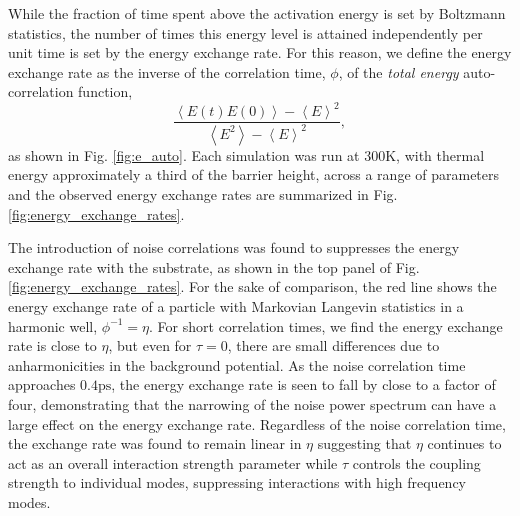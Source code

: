 \documentclass[7pt]{article}
\newcommand{\ps}{\si{\pico\second}}
\newcommand{\K}{\si{\kelvin}}
\begin{document}
While the fraction of time spent above the activation energy is set by Boltzmann statistics, the number of times this energy level is attained independently per unit time is set by the energy exchange rate. For this reason, we define the energy exchange rate as the inverse of the correlation time, $\phi$, of the \emph{total energy} auto-correlation function, $$\frac{\left<E(t)E(0)\right> - \left<E\right>^2}{\left<E^2\right> - \left<E\right>^2},$$ as shown in Fig. \ref{fig:e_auto}. Each simulation was run at $300\K$, with thermal energy approximately a third of the barrier height, across a range of parameters and the observed energy exchange rates are summarized in Fig. \ref{fig:energy_exchange_rates}. 
 
The introduction of noise correlations was found to suppresses the energy exchange rate with the substrate, as shown in the top panel of Fig. \ref{fig:energy_exchange_rates}. For the sake of comparison, the red line shows the energy exchange rate of a particle with Markovian Langevin statistics in a harmonic well, $\phi^{-1}=\eta$. For short correlation times, we find the energy exchange rate is close to $\eta$, but even for $\tau=0$, there are small differences due to anharmonicities in the background potential. As the noise correlation time approaches $0.4\ps$, the energy exchange rate is seen to fall by close to a factor of four, demonstrating that the narrowing of the noise power spectrum can have a large effect on the energy exchange rate. Regardless of the noise correlation time, the exchange rate was found to remain linear in $\eta$ suggesting that $\eta$ continues to act as an overall interaction strength parameter while $\tau$ controls the coupling strength to individual modes, suppressing interactions with high frequency modes. 
\end{document}
